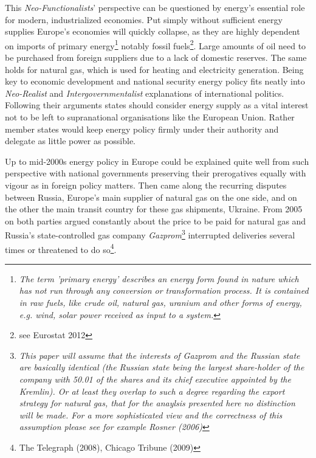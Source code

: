 \documentclass[11pt,a4paper,english]{scrreprt}
\begin{document}
This \emph{Neo-Functionalists}' perspective can be questioned by energy's
essential role for modern, industrialized economies. Put simply without
sufficient energy supplies Europe's economies will quickly collapse, as
they are highly dependent on imports of primary
energy\footnote{\textcolor{dunkelgrau.80}{\textsl{The term 'primary energy'
describes an energy form found in nature which has not run through any
conversion or transformation process. It is contained in raw fuels, like crude
oil, natural gas, uranium and other forms of energy, e.g. wind, solar power
received as input to a system.}}} notably fossil fuels\footnote{see Eurostat
2012}. Large amounts of oil need to be purchased from foreign suppliers due to a
lack of domestic reserves. The same holds for natural gas, which is used for
heating and electricity generation. Being key to economic development and
national security energy policy fits neatly into \emph{Neo-Realist} and
\emph{Intergovernmentalist} explanations of international politics. Following
their arguments states should consider energy supply as a vital interest not to
be left to supranational organisations like the European Union. Rather member
states would keep energy policy firmly under their authority and delegate as
little power as possible.\par

Up to mid-2000s energy policy in Europe could be explained quite well from such
perspective with national governments preserving their prerogatives equally
with vigour as in foreign policy matters. Then came along the recurring
disputes between Russia, Europe's main supplier of natural gas on the one side,
and on the other the main transit country for these gas shipments, Ukraine. From
2005 on both parties argued constantly about the price to be paid for
natural gas and Russia's state-controlled gas company
\textsl{Gazprom}\footnote{\textcolor{dunkelgrau.80}{\textsl{This
paper will assume that the interests of Gazprom and the Russian state are
basically identical (the Russian state being the largest share-holder of the
company with 50.01\textdiscount{} of the shares and its chief executive
appointed by the Kremlin). Or at least they overlap to such a degree regarding
the export strategy for natural gas, that for the anaylsis presented here no
distinction will be made. For a more sophisticated view and the correctness of
this assumption please see for example Rosner (2006)}}} interrupted deliveries
several times or threatened to do so\footnote{The Telegraph (2008), Chicago
Tribune (2009)}.\par
\end{document}
